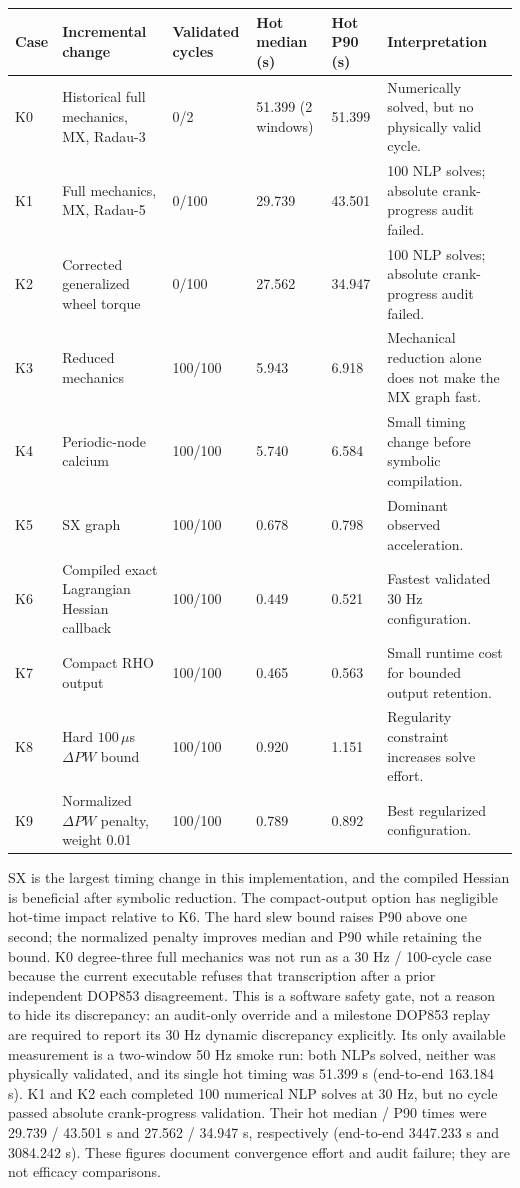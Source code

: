 \documentclass[10pt]{article}
\begin{document}
\begin{longtable}{@{}p{}p{}p{}p{}p{}p{}@{}}
\toprule
Case & Incremental change & Validated cycles & Hot median (s) & Hot P90 (s) & Interpretation\\
\midrule
\endhead
K0 & Historical full mechanics, MX, Radau-3 & 0/2 & 51.399 (2 windows) & 51.399 & Numerically solved, but no physically valid cycle.\\
K1 & Full mechanics, MX, Radau-5 & 0/100 & 29.739 & 43.501 & 100 NLP solves; absolute crank-progress audit failed.\\
K2 & Corrected generalized wheel torque & 0/100 & 27.562 & 34.947 & 100 NLP solves; absolute crank-progress audit failed.\\
K3 & Reduced mechanics & 100/100 & 5.943 & 6.918 & Mechanical reduction alone does not make the MX graph fast.\\
K4 & Periodic-node calcium & 100/100 & 5.740 & 6.584 & Small timing change before symbolic compilation.\\
K5 & SX graph & 100/100 & 0.678 & 0.798 & Dominant observed acceleration.\\
K6 & Compiled exact Lagrangian Hessian callback & 100/100 & 0.449 & 0.521 & Fastest validated 30 Hz configuration.\\
K7 & Compact RHO output & 100/100 & 0.465 & 0.563 & Small runtime cost for bounded output retention.\\
K8 & Hard $100\,\mu$s $\Delta PW$ bound & 100/100 & 0.920 & 1.151 & Regularity constraint increases solve effort.\\
K9 & Normalized $\Delta PW$ penalty, weight 0.01 & 100/100 & 0.789 & 0.892 & Best regularized configuration.\\
\bottomrule
\end{longtable}

SX is the largest timing change in this implementation, and the compiled Hessian is beneficial after symbolic reduction. The compact-output option has negligible hot-time impact relative to K6. The hard slew bound raises P90 above one second; the normalized penalty improves median and P90 while retaining the bound. K0 degree-three full mechanics was not run as a 30 Hz / 100-cycle case because the current executable refuses that transcription after a prior independent DOP853 disagreement. This is a software safety gate, not a reason to hide its discrepancy: an audit-only override and a milestone DOP853 replay are required to report its 30 Hz dynamic discrepancy explicitly. Its only available measurement is a two-window 50 Hz smoke run: both NLPs solved, neither was physically validated, and its single hot timing was 51.399 s (end-to-end 163.184 s). K1 and K2 each completed 100 numerical NLP solves at 30 Hz, but no cycle passed absolute crank-progress validation. Their hot median / P90 times were 29.739 / 43.501 s and 27.562 / 34.947 s, respectively (end-to-end 3447.233 s and 3084.242 s). These figures document convergence effort and audit failure; they are not efficacy comparisons.
\end{document}
